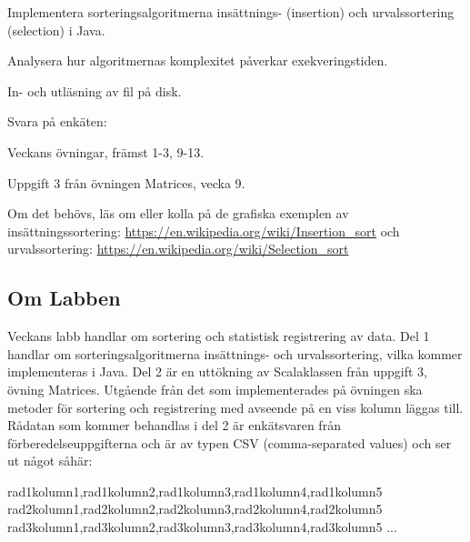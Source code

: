 

\Lab{\LabWeekTEN}

\begin{Goals}
\item Implementera sorteringsalgoritmerna insättnings- (insertion) och urvalssortering (selection) i Java.
\item Analysera hur algoritmernas komplexitet påverkar exekveringstiden.
\item In- och utläsning av fil på disk.
\end{Goals}

\begin{Preparations}
\item Svara på enkäten: %
\item {}
\item Veckans övningar, främst 1-3, 9-13.
\item Uppgift 3 från övningen Matrices, vecka 9.%
\item Om det behövs, läs om eller kolla på de grafiska exemplen av insättningssortering: \url{https://en.wikipedia.org/wiki/Insertion_sort} och urvalssortering: \url{https://en.wikipedia.org/wiki/Selection_sort}
\end{Preparations}

\subsection{Om Labben}

Veckans labb handlar om sortering och statistisk registrering av data. Del 1 handlar om sorteringsalgoritmerna insättnings- och urvalssortering, vilka kommer implementeras i Java. Del 2 är en uttökning av Scalaklassen  från uppgift 3, övning Matrices. Utgående från det som implementerades på övningen ska metoder för sortering och registrering med avseende på en viss kolumn läggas till. Rådatan som kommer behandlas i del 2 är enkätsvaren från förberedelseuppgifterna och är av typen CSV (comma-separated values) och ser ut något såhär:
\begin{Code}
rad1kolumn1,rad1kolumn2,rad1kolumn3,rad1kolumn4,rad1kolumn5
rad2kolumn1,rad2kolumn2,rad2kolumn3,rad2kolumn4,rad2kolumn5
rad3kolumn1,rad3kolumn2,rad3kolumn3,rad3kolumn4,rad3kolumn5
...
\end{Code}

